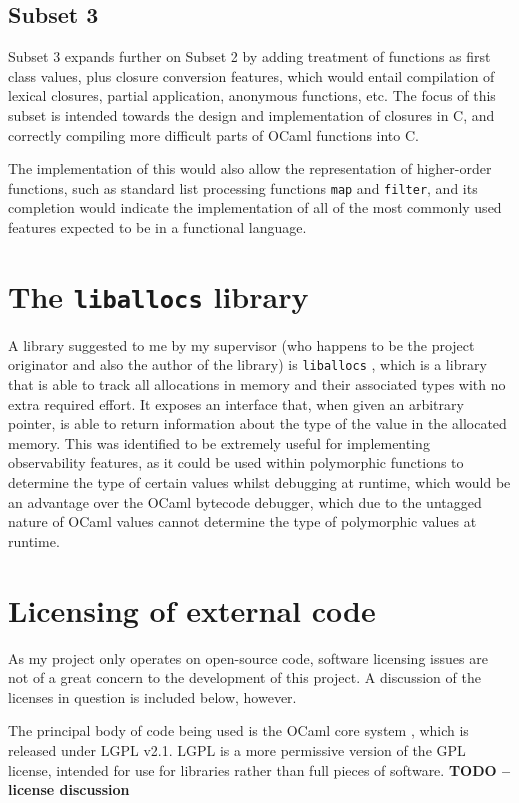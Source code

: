 \documentclass[12pt,a4paper,twoside,openright]{report}
\begin{document}
\subsection{Subset 3}

Subset 3 expands further on Subset 2 by adding treatment of functions as first 
class values, plus closure conversion features, which would entail compilation 
of lexical closures, partial application, anonymous functions, etc. The focus 
of this subset is intended towards the design and implementation of closures in 
C, and correctly compiling more difficult parts of OCaml functions into C.

The implementation of this would also allow the representation of higher-order 
functions, such as standard list processing functions \texttt{map} and 
\texttt{filter}, and its completion would indicate the implementation of all of 
the most commonly used features expected to be in a functional language. 

\section{The \texttt{liballocs} library}

A library suggested to me by my supervisor (who happens to be the project 
originator and also the author of the library) is \texttt{liballocs} 
\cite{liballocs}, which is a library that is able to track all allocations in 
memory and their associated types with no extra required effort. It exposes an 
interface that, when given an arbitrary pointer, is able to return information 
about the type of the value in the allocated memory. This was identified to be 
extremely useful for implementing observability features, as it could be used 
within polymorphic functions to determine the type of certain values whilst 
debugging at runtime, which would be an advantage over the OCaml bytecode 
debugger, which due to the untagged nature of OCaml values cannot determine the 
type of polymorphic values at runtime.

\section{Licensing of external code}

As my project only operates on open-source code, software licensing issues are 
not of a great concern to the development of this project. A discussion of the 
licenses in question is included below, however.

The principal body of code being used is the OCaml core system 
\cite{ocamlcompiler}, which is released under LGPL v2.1. LGPL is a more 
permissive version of the GPL license, intended for use for libraries rather 
than full pieces of software. \textbf{TODO -- license discussion}
\end{document}
